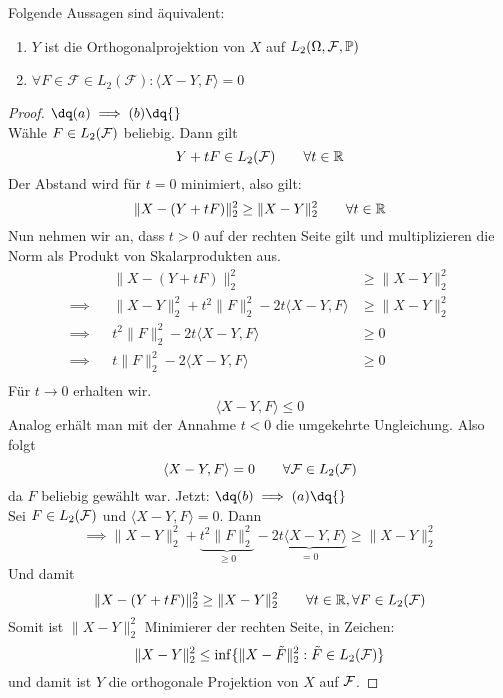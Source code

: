 \begin{proposition}\label{Prop1.3}
	Folgende Aussagen sind äquivalent:
	\renewcommand{\labelenumi}{(\alph{enumi})}
	\begin{enumerate}
		\item $Y$ ist die Orthogonalprojektion von $X$ auf $L_2(\Omega,\mathcal{F},\P)$ 
		\item $\forall F\in\mathcal{F}\in L_2(\mathcal{F}):\langle X-Y,F\rangle=0$
	\end{enumerate}
\end{proposition}

\begin{proof}
	$\dq (a) \implies (b) \dq{}$ \\
	Wähle $F \in L_2(\F)$ beliebig. Dann gilt
	\[Y + tF \in L_2(\F) \qquad \forall t \in \R\]
	Der Abstand wird für $t=0$ minimiert, also gilt:
	\[\|X-(Y+tF)\|_2^2 \geq \|X-Y\|_2^2 \qquad \forall t \in \R\]
	Nun nehmen wir an, dass $t>0$ auf der rechten Seite gilt und multiplizieren die Norm als Produkt von Skalarprodukten aus.
	\begin{align*}
		&&\|X-(Y+tF)\|_2^2 &\geq \|X-Y\|_2^2 \\
		\implies	&&\|X-Y\|_2^2 + t^2\|F\|_2^2 - 2t\langle X-Y, F \rangle &\geq \|X-Y\|_2^2 \\
		\implies	&&t^2\|F\|_2^2 - 2t\langle X-Y, F \rangle &\geq 0 \\
		\implies	&&t\|F\|_2^2 - 2\langle X-Y, F \rangle &\geq 0 \\
	\end{align*}
	Für $t\rightarrow0$ erhalten wir.
		\[\langle X-Y, F \rangle \leq 0\]
	Analog erhält man mit der Annahme $t<0$ die umgekehrte Ungleichung.
	Also folgt
	\[\langle X-Y, F \rangle = 0 \qquad \forall \F \in L_2(\F)\]
	da $F$ beliebig gewählt war.\nl
	Jetzt: $\dq (b) \implies (a) \dq{}$\\
	Sei $F\in L_2(\F)$ und $\langle X-Y, F \rangle = 0$. Dann
	\[\implies \|X-Y\|_2^2 + \underbrace{t^2\|F\|_2^2}_{\geq 0} - \underbrace{2t\langle X-Y, F \rangle}_{=0} \geq \|X-Y\|_2^2\]
	Und damit 
	\[\|X-(Y+tF)\|_2^2 \geq \|X-Y\|_2^2 \qquad \forall t\in\R, \forall F\in L_2(\F)\]
	Somit ist $\|X-Y\|_2^2$ Minimierer der rechten Seite, in Zeichen:
	\[\|X-Y\|_2^2 \leq \inf\{\|X-\tilde{F}\|_2^2 : \tilde{F}\in L_2(\F)\}\]
	und damit ist $Y$ die orthogonale Projektion von $X$ auf $\F$.
\end{proof}


